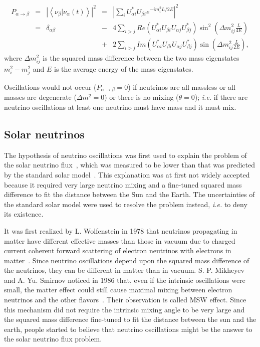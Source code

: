 \begin{equation}
  \label{eq:pa2b}
  \begin{array}{ccccl}
    P_{\alpha \rightarrow \beta} &=& \left| \left\langle                 \nu_{\beta}|\nu_{\alpha}(t) \right\rangle \right|^{2} &=&     {\displaystyle \left|       \sum_{i}U_{\alpha i}^{*}U_{\beta i}e^{-i           m_{i}^2 L/2E} \right|^{2}}\\ &=& \delta_{\alpha\beta} &-&     4{\displaystyle \sum_{i>j}Re(U_{\alpha         i}^{*}U_{\beta         i}U_{\alpha j}U_{\beta j}^{*})\sin^{2}(\Delta     m_{ij}^{2}       \frac{L}{4E})}\\ & & &+& {\displaystyle 2\sum_{i>j}Im(U_{\alpha         i}^{*}U_{\beta i}U_{\alpha j}U_{\beta j}^{*})\sin(\Delta       m_{ij}^{2}\frac{L}{2E})},
  \end{array}
\end{equation}
where $\Delta m^{2}_{ij}$ is the squared mass difference between the
two mass eigenstates $m^{2}_{i} - m^{2}_{j}$ and $E$ is the
average energy of the mass eigenstates.

Oscillations would not occur ($P_{\alpha \rightarrow \beta} = 0$) if neutrinos are all massless or all masses are degenerate ($\Delta m^{2} = 0$) or there is no mixing ($\theta = 0$); \textit{i.e.} if there are neutrino oscillations at least one neutrino must have mass and it must mix.

\subsection{Solar neutrinos}
\label{sec:solar}
The hypothesis of neutrino oscillations was first used to explain the problem of the solar neutrino flux~\cite{Dav64,Dav68}, which was measured to be lower than that was predicted by the standard solar model~\cite{Bah98}. This explanation was at first not widely accepted because it required very large neutrino mixing and a fine-tuned squared mass difference to fit the distance between the Sun and the Earth. The uncertainties of the standard solar model were used to resolve the problem instead, \textit{i.e.} to deny its existence.

It was first realized by L. Wolfenstein in 1978 that neutrinos propagating in matter have different effective masses than those in vacuum due to charged current coherent forward scattering of electron neutrinos with electrons in matter~\cite{Wol78}. Since neutrino oscillations depend upon the squared mass difference of the neutrinos, they can be different in matter than in vacuum. S. P. Mikheyev and A. Yu. Smirnov noticed in 1986 that, even if the intrinsic oscillations were small, the matter effect could still cause maximal mixing between electron neutrinos and the other flavors~\cite{Mik86}. Their observation is called MSW effect. Since this mechanism did not require the intrinsic mixing angle to be very large and the squared mass difference fine-tuned to fit the distance between the sun and the earth, people started to believe that neutrino oscillations might be the answer to the solar neutrino flux problem.

